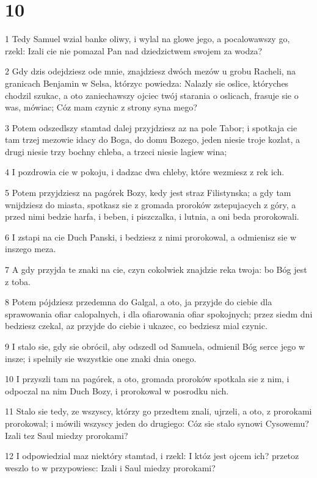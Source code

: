 \chapter{10}

\par 1 Tedy Samuel wzial banke oliwy, i wylal na glowe jego, a pocalowawszy go, rzekl: Izali cie nie pomazal Pan nad dziedzictwem swojem za wodza?
\par 2 Gdy dzis odejdziesz ode mnie, znajdziesz dwóch mezów u grobu Racheli, na granicach Benjamin w Selsa, którzyc powiedza: Nalazly sie oslice, któryches chodzil szukac, a oto zaniechawszy ojciec twój starania o oslicach, frasuje sie o was, mówiac; Cóz mam czynic z strony syna mego?
\par 3 Potem odszedlszy stamtad dalej przyjdziesz az na pole Tabor; i spotkaja cie tam trzej mezowie idacy do Boga, do domu Bozego, jeden niesie troje kozlat, a drugi niesie trzy bochny chleba, a trzeci niesie lagiew wina;
\par 4 I pozdrowia cie w pokoju, i dadzac dwa chleby, które wezmiesz z rek ich.
\par 5 Potem przyjdziesz na pagórek Bozy, kedy jest straz Filistynska; a gdy tam wnijdziesz do miasta, spotkasz sie z gromada proroków zstepujacych z góry, a przed nimi bedzie harfa, i beben, i piszczalka, i lutnia, a oni beda prorokowali.
\par 6 I zstapi na cie Duch Panski, i bedziesz z nimi prorokowal, a odmienisz sie w inszego meza.
\par 7 A gdy przyjda te znaki na cie, czyn cokolwiek znajdzie reka twoja: bo Bóg jest z toba.
\par 8 Potem pójdziesz przedemna do Galgal, a oto, ja przyjde do ciebie dla sprawowania ofiar calopalnych, i dla ofiarowania ofiar spokojnych; przez siedm dni bedziesz czekal, az przyjde do ciebie i ukazec, co bedziesz mial czynic.
\par 9 I stalo sie, gdy sie obrócil, aby odszedl od Samuela, odmienil Bóg serce jego w insze; i spelnily sie wszystkie one znaki dnia onego.
\par 10 I przyszli tam na pagórek, a oto, gromada proroków spotkala sie z nim, i odpoczal na nim Duch Bozy, i prorokowal w posrodku nich.
\par 11 Stalo sie tedy, ze wszyscy, którzy go przedtem znali, ujrzeli, a oto, z prorokami prorokowal; i mówili wszyscy jeden do drugiego: Cóz sie stalo synowi Cysowemu? Izali tez Saul miedzy prorokami?
\par 12 I odpowiedzial maz niektóry stamtad, i rzekl: I któz jest ojcem ich? przetoz weszlo to w przypowiesc: Izali i Saul miedzy prorokami?
